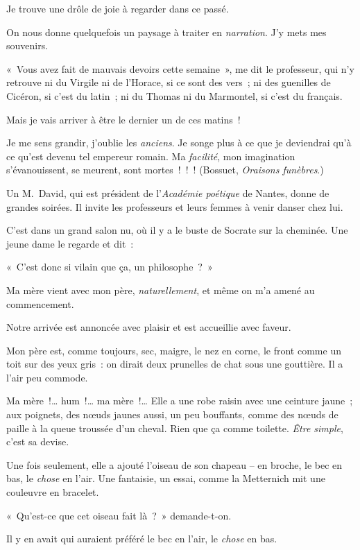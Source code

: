 \documentclass[french,twoside]{book} %
\begin{document}
Je trouve une drôle de joie à regarder dans ce passé.\par
On nous donne quelquefois un paysage à traiter en \emph{narration}. J’y mets mes souvenirs.\par
« Vous avez fait de mauvais devoirs cette semaine », me dit le professeur, qui n’y retrouve ni du Virgile ni de l’Horace, si ce sont des vers ; ni des guenilles de Cicéron, si c’est du latin ; ni du Thomas ni du Marmontel, si c’est du français.\par
Mais je vais arriver à être le dernier un de ces matins !\par
Je me sens grandir, j’oublie les \emph{anciens}. Je songe plus à ce que je deviendrai qu’à ce qu’est devenu tel empereur romain. Ma\emph{ facilité}, mon imagination s’évanouissent, se meurent, sont mortes ! ! ! (Bossuet, \emph{Oraisons funèbres}.)\par
\bigbreak
\noindent Un M. David, qui est président de l’\emph{Académie poétique} de Nantes, donne de grandes soirées. Il invite les professeurs et leurs femmes à venir danser chez lui.\par
C’est dans un grand salon nu, où il y a le buste de Socrate sur la cheminée. Une jeune dame le regarde et dit :\par
« C’est donc si vilain que ça, un philosophe ? »\par
Ma mère vient avec mon père, \emph{naturellement}, et même on m’a amené au commencement.\par
Notre arrivée est annoncée avec plaisir et est accueillie avec faveur.\par
Mon père est, comme toujours, sec, maigre, le nez en corne, le front comme un toit sur des yeux gris : on dirait deux prunelles de chat sous une gouttière. Il a l’air peu commode.\par
Ma mère !… hum !… ma mère !… Elle a une robe raisin avec une ceinture jaune ; aux poignets, des nœuds jaunes aussi, un peu bouffants, comme des nœuds de paille à la queue troussée d’un cheval. Rien que ça comme toilette.\emph{ Être simple}, c’est sa devise.\par
Une fois seulement, elle a ajouté l’oiseau de son chapeau – en broche, le bec en bas, le \emph{chose} en l’air. Une fantaisie, un essai, comme la Metternich mit une couleuvre en bracelet.\par
« Qu’est-ce que cet oiseau fait là ? » demande-t-on.\par
Il y en avait qui auraient préféré le bec en l’air, le \emph{chose} en bas.\par
\end{document}
